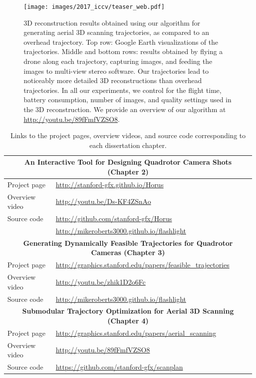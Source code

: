 \begin{figure}[t!]
\begin{center}
\texttt{[image: images/2017\_iccv/teaser\_web.pdf]}
\end{center}
\caption{
3D reconstruction results obtained using our algorithm for generating aerial 3D scanning trajectories, as compared to an overhead trajectory.
Top row: Google Earth visualizations of the trajectories.
Middle and bottom rows: results obtained by flying a drone along each trajectory, capturing images, and feeding the images to multi-view stereo software.
Our trajectories lead to noticeably more detailed 3D reconstructions than overhead trajectories.
In all our experiments, we control for the flight time, battery consumption, number of images, and quality settings used in the 3D reconstruction.
We provide an overview of our algorithm at \url{http://youtu.be/89fFmfVZSO8}.
}
\label{fig:ch1:teaser_ch4}
\end{figure}


\begin{table}[t]
\centering
\footnotesize
\begin{tabular}{@{}ll@{}}
\toprule
\multicolumn{2}{c}{ \textbf{An Interactive Tool for Designing Quadrotor Camera Shots (Chapter 2)} } \\
\midrule
Project page   & \url{http://stanford-gfx.github.io/Horus}         \\ 
Overview video & \url{http://youtu.be/Ds-KF4ZSnAo}                 \\  
Source code    & \url{http://github.com/stanford-gfx/Horus}        \\
               & \url{http://mikeroberts3000.github.io/flashlight} \\
\midrule
\multicolumn{2}{c}{ \textbf{Generating Dynamically Feasible Trajectories for Quadrotor Cameras (Chapter 3)} } \\
\midrule
Project page   & \url{http://graphics.stanford.edu/papers/feasible_trajectories} \\ 
Overview video & \url{http://youtu.be/zhik1D2o6Fc}                               \\  
Source code    & \url{http://mikeroberts3000.github.io/flashlight}               \\
\midrule
\multicolumn{2}{c}{ \textbf{Submodular Trajectory Optimization for Aerial 3D Scanning (Chapter 4)} } \\
\midrule
Project page   & \url{http://graphics.stanford.edu/papers/aerial_scanning} \\ 
Overview video & \url{http://youtu.be/89fFmfVZSO8}                         \\  
Source code    & \url{https://github.com/stanford-gfx/scanplan}            \\
\bottomrule
\end{tabular}
\normalsize
\caption{
Links to the project pages, overview videos, and source code corresponding to each dissertation chapter.
}
\label{tbl:ch1:links}
\end{table}


